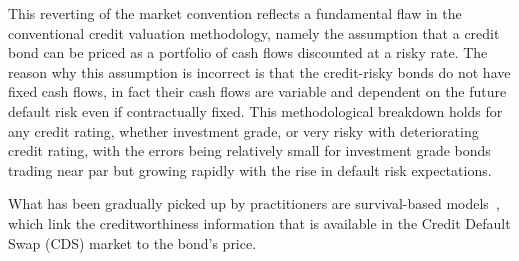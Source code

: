\documentclass[reviewdoc]{pmv_report}  %
\begin{document}
This reverting of the market convention reflects a fundamental flaw in the conventional credit valuation methodology, namely the assumption that a credit bond can be priced as a portfolio of cash flows discounted at a risky rate.
The reason why this assumption is incorrect is that the credit-risky bonds do not have fixed cash flows, in fact their cash flows are variable and dependent on the future default risk even if contractually fixed.
This methodological breakdown holds for any credit rating, whether investment grade, or very risky with deteriorating credit rating, with the errors being relatively small for investment grade bonds trading near par but growing rapidly with the rise in default risk expectations.

What has been gradually picked up by practitioners are survival-based models~\cite{Scho04}, which link the creditworthiness information that is available in the Credit Default Swap (CDS) market to the bond's price.
\end{document}
